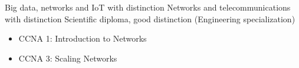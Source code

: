 \documentclass[10pt,a4paper,ragged2e,withhyper]{altacv}
\begin{document}
\begin{paracol}{2}
Big data, networks and IoT with distinction
\smallbreak
\divider
{}
Networks and telecommunications with distinction
\smallbreak
\divider
{}
Scientific diploma, good distinction (Engineering specialization)

\begin{itemize}
  \item CCNA 1: Introduction to Networks
  \item CCNA 3: Scaling Networks
\end{itemize}

\end{paracol}
\end{document}

